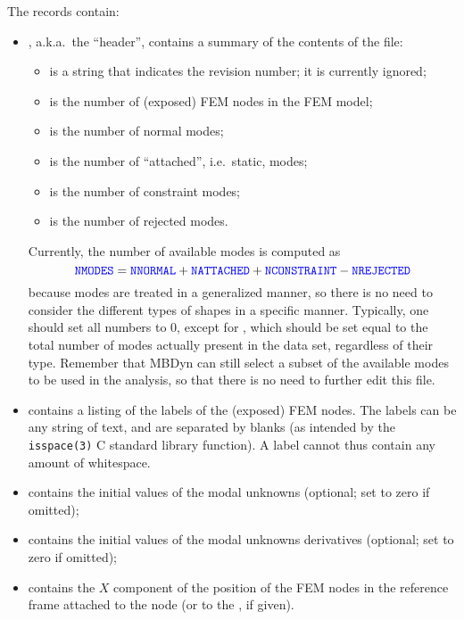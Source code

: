 The records contain:
\begin{itemize}
\item {}, a.k.a.\ the ``header'', contains a summary
of the contents of the file:
	\begin{itemize}
	\item {} is a string that indicates the revision number;
	it is currently ignored;
	\item {} is the number of (exposed) FEM nodes 
	in the FEM model;
	\item {} is the number of normal modes;
	\item {} is the number of ``attached'',
	i.e.\ static, modes;
	\item {} is the number of constraint modes;
	\item {} is the number of rejected modes.
	\end{itemize}
Currently, the number of available modes is computed as
\begin{displaymath}
	\textcolor{blue}{\texttt{NMODES}} = \textcolor{blue}{\texttt{NNORMAL}} + \textcolor{blue}{\texttt{NATTACHED}}
		+ \textcolor{blue}{\texttt{NCONSTRAINT}} - \textcolor{blue}{\texttt{NREJECTED}}
\end{displaymath}
because modes are treated in a generalized manner,
so there is no need to consider the different types of shapes
in a specific manner.
Typically, one should set all numbers to 0, except for
, which should be set equal to the total number of modes
actually present in the data set, regardless of their type.
Remember that MBDyn can still select a subset of the available 
modes to be used in the analysis, so that there is no need 
to further edit this file.

\item {} contains a listing of the  labels
of the (exposed) FEM nodes.
The labels can be any string of text, and are separated by blanks
(as intended by the \texttt{isspace(3)} C standard library function).
A label cannot thus contain any amount of whitespace.

\item {} contains the initial values of the 
modal unknowns  (optional; set to zero if omitted);

\item {} contains the initial values of the 
modal unknowns derivatives (optional; set to zero if omitted);

\item {} contains the $X$ component of the position
of the  FEM nodes in the reference frame attached 
to the  node (or to the , if given).


\end{itemize}
